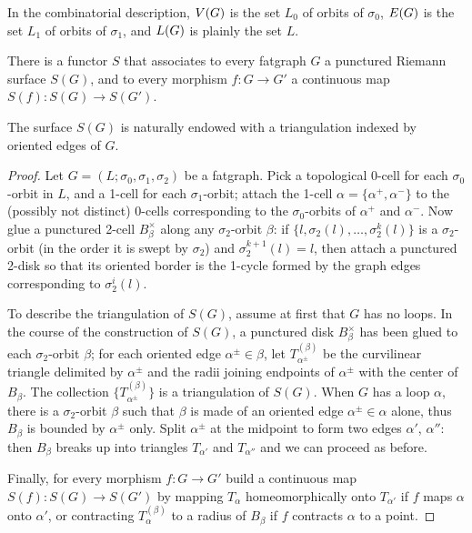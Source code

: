 In the combinatorial description, $V(G)$ is the set $L_0$ of
orbits of $\sigma_0$, $E(G)$ is the set $L_1$ of orbits of $\sigma_1$, and
$L(G)$ is plainly the set $L$.  

\begin{lemma}
  \label{lemma:S-functor}
  \begin{inparaenum}
  \item There is a functor $S$ that associates to every fatgraph
    $G$ a punctured Riemann surface $S(G)$, and to every morphism $f:
    G \to G'$ a continuous map $S(f): S(G) \to S(G')$.
  \item The surface $S(G)$ is naturally endowed with a triangulation
    indexed by oriented edges of $G$.
  \end{inparaenum}
\end{lemma}
\begin{proof}
  Let $G = (L; \sigma_0, \sigma_1, \sigma_2)$ be a fatgraph.  Pick a
  topological 0-cell for each $\sigma_0$-orbit in $L$, and a 1-cell
  for each $\sigma_1$-orbit; attach the 1-cell $\alpha = \{\alpha^+,
  \alpha^-\}$ to the (possibly not distinct) 0-cells corresponding to
  the $\sigma_0$-orbits of $\alpha^+$ and $\alpha^-$.  Now glue a
  punctured 2-cell $B_\beta^\times$ along any $\sigma_2$-orbit
  $\beta$: if $\{l, \sigma_2(l), \ldots, \sigma_2^k(l)\}$ is a
  $\sigma_2$-orbit (in the order it is swept by $\sigma_2$) and
  $\sigma_2^{k+1}(l) = l$, then attach a punctured 2-disk so that its
  oriented border is the 1-cycle formed by the graph edges
  corresponding to $\sigma_2^i(l)$.

  To describe the triangulation of $S(G)$, assume at first that $G$
  has no loops.  In the course of the construction of $S(G)$, a
  punctured disk $B_\beta^\times$ has been glued to each
  $\sigma_2$-orbit $\beta$; for each oriented edge $\alpha^\pm \in
  \beta$, let $T_{\alpha^\pm}^{(\beta)}$ be the curvilinear triangle
  delimited by $\alpha^\pm$ and the radii joining endpoints of
  $\alpha^\pm$ with the center of $B_\beta$.  The collection $\{
  T_{\alpha^\pm}^{(\beta)} \}$ is a triangulation of $S(G)$.  When $G$
  has a loop $\alpha$, there is a $\sigma_2$-orbit $\beta$ such that
  $\beta$ is made of an oriented edge $\alpha^\pm \in \alpha$ alone,
  thus $B_\beta$ is bounded by $\alpha^\pm$ only.  Split $\alpha^\pm$
  at the midpoint to form two edges $\alpha'$, $\alpha''$: then
  $B_\beta$ breaks up into triangles $T_{\alpha'}$ and $T_{\alpha''}$
  and we can proceed as before.

  Finally, for every morphism $f: G \to G'$ build a continuous map
  $S(f): S(G) \to S(G')$ by mapping $T_\alpha$ homeomorphically onto $T_{\alpha'}$
  if $f$ maps $\alpha$ onto $\alpha'$, or contracting $T_\alpha^{(\beta)}$ to a radius of
  $B_\beta$ if $f$ contracts $\alpha$ to a point.
\end{proof}
